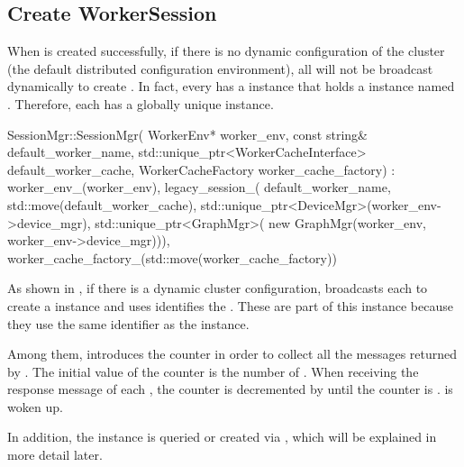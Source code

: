 \begin{content}
\subsection{Create WorkerSession}
When  is created successfully, if there is no dynamic configuration of the cluster (the default distributed configuration environment), all  will not be broadcast dynamically to create . In fact, every  has a  instance that holds a  instance named . Therefore, each  has a globally unique  instance.

\begin{leftbar}
\begin{c++}
SessionMgr::SessionMgr(
    WorkerEnv* worker_env, 
    const string& default_worker_name,
    std::unique_ptr<WorkerCacheInterface> default_worker_cache,
    WorkerCacheFactory worker_cache_factory)
    : worker_env_(worker_env),
      legacy_session_(
          default_worker_name, 
          std::move(default_worker_cache),
          std::unique_ptr<DeviceMgr>(worker_env->device_mgr),
          std::unique_ptr<GraphMgr>(
              new GraphMgr(worker_env, 
              worker_env->device_mgr))),
      worker_cache_factory_(std::move(worker_cache_factory)) {}
\end{c++}
\end{leftbar}

As shown in , if there is a dynamic cluster configuration,  broadcasts each  to create a  instance and uses  identifies the . These  are part of this  instance because they use the same  identifier as the  instance.

Among them,  introduces the  counter in order to collect all the  messages returned by . The initial value of the  counter is the number of . When receiving the response message of each , the counter is decremented by  until the counter is .  is woken up.

In addition, the  instance is queried or created via , which will be explained in more detail later.


\end{content}

